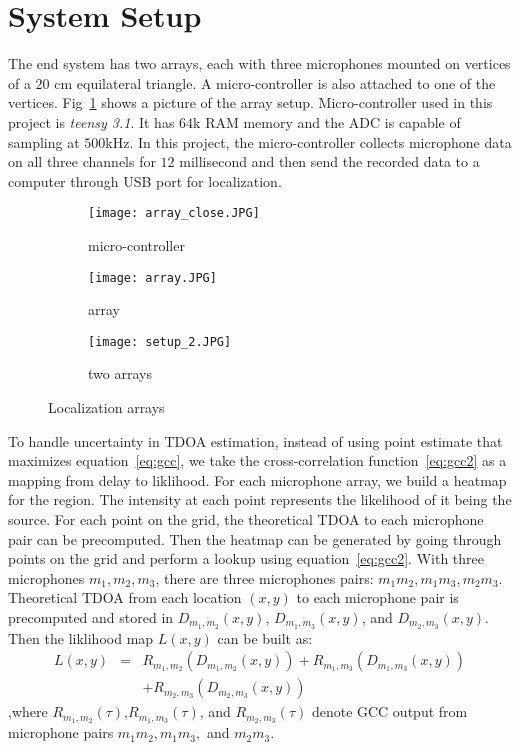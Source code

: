 \section{System Setup}
The end system has two arrays, each with three microphones mounted on vertices of a $20$ cm equilateral triangle. A micro-controller is also attached to one of the vertices. Fig~\ref{fig:setup_array} shows a picture of the array setup. Micro-controller used in this project is \emph{teensy 3.1}. It has $64$k RAM memory and the ADC is capable of sampling at $500$kHz. In this project, the micro-controller collects microphone data on all three channels for $12$ millisecond and then send the recorded data to a computer through USB port for localization. 

\begin{figure}[]
  \centering
  \begin{subfigure}[]{.23\textwidth}
    \texttt{[image: array\_close.JPG]}
    \caption{micro-controller}
  \end{subfigure}
  \begin{subfigure}[]{.23\textwidth}
    \texttt{[image: array.JPG]}
    \caption{array}
  \end{subfigure}
  \begin{subfigure}[]{.23\textwidth}
    \texttt{[image: setup\_2.JPG]}
    \caption{two arrays}
  \end{subfigure}
  \caption{Localization arrays}
  \label{fig:setup_array}
\end{figure}

To handle uncertainty in TDOA estimation, instead of using point estimate that maximizes equation~\ref{eq:gcc}, we take the cross-correlation function~\ref{eq:gcc2} as a mapping from delay to liklihood. For each microphone array, we build a heatmap for the region. The intensity at each point represents the likelihood of it being the source. For each point on the grid, the theoretical TDOA to each microphone pair can be precomputed. Then the heatmap can be generated by going through points on the grid and perform a lookup using equation~\ref{eq:gcc2}. With three microphones $m_1,m_2,m_3$, there are three microphones pairs: $m_1m_2,m_1m_3,m_2m_3$. Theoretical TDOA from each location $(x,y)$ to each microphone pair is precomputed and stored in $D_{m_1,m_2}(x,y)$, $D_{m_1,m_3}(x,y)$, and $D_{m_2,m_3}(x,y)$. Then the liklihood map $L(x,y)$ can be built as:
\begin{eqnarray*}
  L(x,y) &=& R_{m_1,m_2}(D_{m_1,m_2}(x,y)) + R_{m_1,m_3}(D_{m_1,m_3}(x,y)) \\
 & & +R_{m_2,m_3}(D_{m_2,m_3}(x,y)) 
\end{eqnarray*}
,where $R_{m_1,m_2}(\tau)$,$R_{m_1,m_3}(\tau)$, and $R_{m_2,m_3}(\tau)$ denote GCC output from microphone pairs $m_1m_2,m_1m_3,$ and $m_2m_3$.


